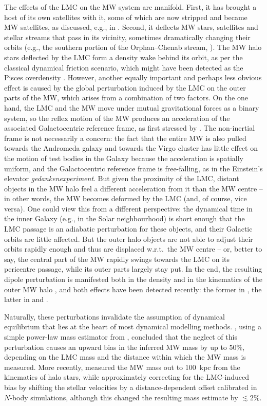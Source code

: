 \documentclass[usenatbib,fleqn]{mnras}
\begin{document}
The effects of the LMC on the MW system are manifold. First, it has brought a host of its own satellites with it, some of which are now stripped and became MW satellites, as discussed, e.g., in \citet{Battaglia2021}. Second, it deflects MW stars, satellites and stellar streams that pass in its vicinity, sometimes dramatically changing their orbits (e.g., the southern portion of the Orphan--Chenab stream, \citealt{Erkal2019}). The MW halo stars deflected by the LMC form a density wake behind its orbit, as per the classical dynamical friction scenario, which might have been detected as the Pisces overdensity \citep{Belokurov2019}. However, another equally important and perhaps less obvious effect is caused by the global perturbation induced by the LMC on the outer parts of the MW, which arises from a combination of two factors. On the one hand, the LMC and the MW move under mutual gravitational forces as a binary system, so the reflex motion of the MW produces an acceleration of the associated Galactocentric reference frame, as first stressed by \citet{Gomez2015}. The non-inertial frame is not necessarily a concern: the fact that the entire MW is also pulled towards the Andromeda galaxy and towards the Virgo cluster has little effect on the motion of test bodies in the Galaxy because the acceleration is spatially uniform, and the Galactocentric reference frame is free-falling, as in the Einstein's elevator \textit{gedankenexperiment}. But given the proximity of the LMC, distant objects in the MW halo feel a different acceleration from it than the MW centre -- in other words, the MW becomes deformed by the LMC (and, of course, vice versa). One could view this from a different perspective: the dynamical time in the inner Galaxy (e.g., in the Solar neighbourhood) is short enough that the LMC passage is an adiabatic perturbation for these objects, and their Galactic orbits are little affected. But the outer halo objects are not able to adjust their orbits rapidly enough and thus are displaced w.r.t.\ the MW centre -- or, better to say, the central part of the MW rapidly swings towards the LMC on its pericentre passage, while its outer parts largely stay put. In the end, the resulting dipole perturbation is manifested both in the density and in the kinematics of the outer MW halo \citep[e.g.,][]{Cunningham2020, GaravitoCamargo2020}, and both effects have been detected recently: the former in \citet{Conroy2021}, the latter in \citet{Erkal2021} and \citet{Petersen2021}.

Naturally, these perturbations invalidate the assumption of dynamical equilibrium that lies at the heart of most dynamical modelling methods. \citet{Erkal2020b}, using a simple power-law mass estimator from \citet{Watkins2010}, concluded that the neglect of this perturbation causes an upward bias in the inferred MW mass by up to 50\%, depending on the LMC mass and the distance within which the MW mass is measured. More recently, \citet{Deason2021} measured the MW mass out to 100~kpc from the kinematics of halo stars, while approximately correcting for the LMC-induced bias by shifting the stellar velocities by a distance-dependent offset calibrated in $N$-body simulations, although this changed the resulting mass estimate by $\lesssim 2\%$.
\end{document}
